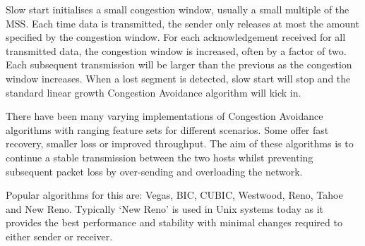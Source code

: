             Slow start initialises a small congestion window, usually a small multiple of the MSS\@. Each time data is transmitted, the sender only releases at most the amount specified by the congestion window. For each acknowledgement received for all transmitted data, the congestion window is increased, often by a factor of two. Each subsequent transmission will be larger than the previous as the congestion window increases. When a lost segment is detected, slow start will stop and the standard linear growth Congestion Avoidance algorithm will kick in.

            There have been many varying implementations of Congestion Avoidance algorithms with ranging feature sets for different scenarios. Some offer fast recovery, smaller loss or improved throughput. The aim of these algorithms is to continue a stable transmission between the two hosts whilst preventing subsequent packet loss by over-sending and overloading the network.

            Popular algorithms for this are: Vegas, BIC, CUBIC, Westwood, Reno, Tahoe and New Reno. Typically `New Reno' is used in Unix systems today as it provides the best performance and stability with minimal changes required to either sender or receiver.
